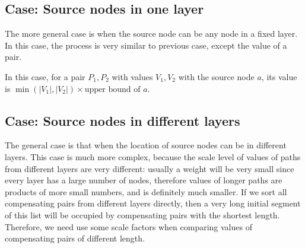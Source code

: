 \documentclass{llncs}
\begin{document}
\subsection*{Case: Source nodes in one layer}

The more general case is when the source node can be any node in a fixed layer. In this case, the process is very similar to previous case, except the value of a pair.

In this case, for a pair $P_1,P_2$ with values $V_1,V_2$ with the source node $a$, its value is $\min(|V_1|,|V_2|)\times \text{upper bound of } a$.

%
%
%
%
%
%
%
%
%


\subsection*{Case: Source nodes in different layers}

The general case is that when the location of source nodes can be in different layers. This case is much more complex, because the scale level of values of paths from different layers are very different: usually a weight will be very small since every layer has a large number of nodes, therefore values of longer paths are products of more small numbers, and is definitely much smaller. If we sort all compensating pairs from different layers directly, then a very long initial segment of this list will be occupied by compensating pairs with the shortest length. Therefore, we need use some scale factors when comparing values of compensating pairs of different length.
\end{document}
